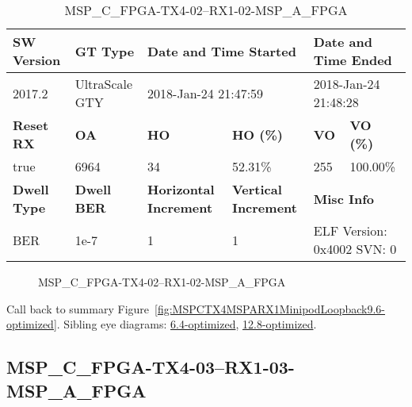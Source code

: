 \begin{table}[h]
\centering
\caption{MSP\_C\_FPGA-TX4-02--RX1-02-MSP\_A\_FPGA}
\label{tab:MSPCFPGATX402RX102MSPAFPGA9.6-optimized}
\begin{tabular}{@{}|l|l|l|l|l|l|@{}}
\toprule
\textbf{SW Version}                & \textbf{GT Type}   & \multicolumn{2}{l|}{\textbf{Date and Time Started}}            & \multicolumn{2}{l|}{\textbf{Date and Time Ended}}        \\ \midrule
2017.2                       & UltraScale GTY          & \multicolumn{2}{l|}{2018-Jan-24 21:47:59}                   & \multicolumn{2}{l|}{2018-Jan-24 21:48:28}               \\ \midrule
\textbf{Reset RX}                  & \textbf{OA} & \textbf{HO}   & \textbf{HO (\%)} & \textbf{VO} & \textbf{VO (\%)} \\ \midrule
true & 6964        & 34          & 52.31\%        & 255        & 100.00\%       \\ \midrule
\textbf{Dwell Type}                & \textbf{Dwell BER} & \textbf{Horizontal Increment} & \textbf{Vertical Increment}    & \multicolumn{2}{l|}{\textbf{Misc Info}}                  \\ \midrule
BER                            & 1e-7        & 1        & 1           & \multicolumn{2}{l|}{ELF Version: 0x4002 SVN: 0}                         \\ \bottomrule
\end{tabular}
\end{table}

\begin{figure}[h]
\caption{MSP\_C\_FPGA-TX4-02--RX1-02-MSP\_A\_FPGA} \label{fig:MSPCFPGATX402RX102MSPAFPGA9.6-optimized}
\end{figure}

Call back to summary Figure~\ref{fig:MSPCTX4MSPARX1MinipodLoopback9.6-optimized}.
Sibling eye diagrams: \hyperref[sec:MSPCFPGATX402RX102MSPAFPGA6.4-optimized]{6.4-optimized}, \hyperref[sec:MSPCFPGATX402RX102MSPAFPGA12.8-optimized]{12.8-optimized}.

\clearpage
\newpage


\subsection{MSP\_C\_FPGA-TX4-03--RX1-03-MSP\_A\_FPGA}\label{sec:MSPCFPGATX403RX103MSPAFPGA9.6-optimized}

